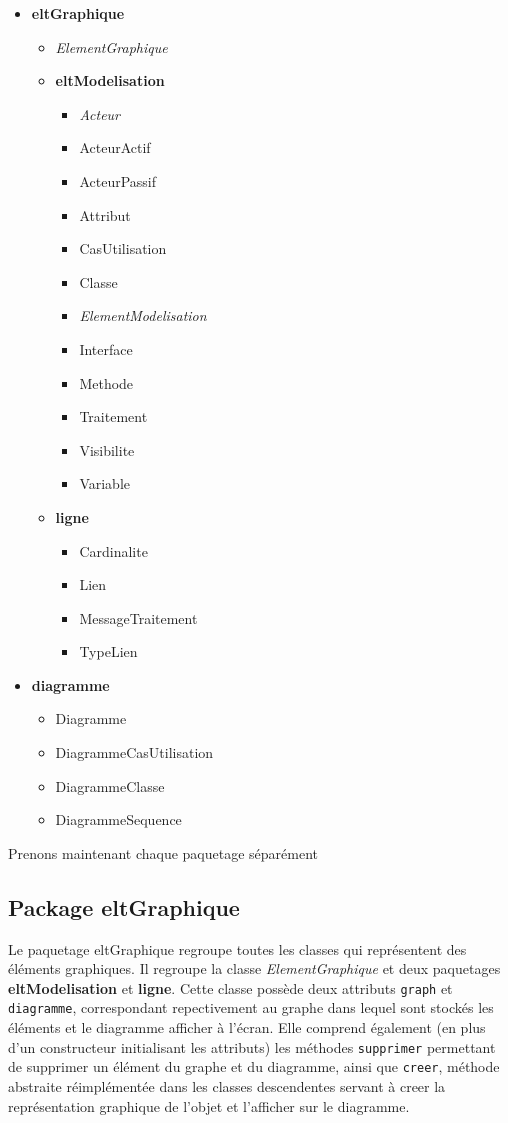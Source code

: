 \documentclass[12pt,a4paper,openany]{report}
\begin{document}
	\begin{itemize}
		\item \textbf{eltGraphique}
			\begin{itemize}
				\item \textit{ElementGraphique}
				\item \textbf{eltModelisation}
					\begin{itemize}
						\item \textit{Acteur}
						\item ActeurActif
						\item ActeurPassif
						\item Attribut
						\item CasUtilisation
						\item Classe
						\item \textit{ElementModelisation}
						\item Interface
						\item Methode
						\item Traitement
						\item Visibilite
						\item Variable
					\end{itemize}
				\item \textbf{ligne}
					\begin{itemize}
						\item Cardinalite
						\item Lien
						\item MessageTraitement
						\item TypeLien
					\end{itemize}
			\end{itemize}
		\item \textbf{diagramme}
			\begin{itemize}
				\item Diagramme
				\item DiagrammeCasUtilisation
				\item DiagrammeClasse
				\item DiagrammeSequence
			\end{itemize}
	\end{itemize}
	\newpage 
	Prenons maintenant chaque paquetage séparément 
	\subsection{Package eltGraphique}
	Le paquetage eltGraphique regroupe toutes les classes qui représentent des éléments graphiques. Il regroupe la classe 
	\textit{ElementGraphique} et deux paquetages \textbf{eltModelisation} et \textbf{ligne}. Cette classe possède deux attributs 
	\texttt{graph} et \texttt{diagramme}, correspondant repectivement au graphe dans lequel sont stockés les éléments 
	et le diagramme afficher à l'écran. Elle comprend également (en plus d'un constructeur initialisant les attributs) 
	les méthodes \texttt{supprimer} permettant de supprimer un élément du graphe et du diagramme, ainsi que \texttt{creer}, 
	méthode abstraite réimplémentée dans les classes descendentes servant à creer la représentation graphique de l'objet 
	et l'afficher sur le diagramme.
\end{document}
